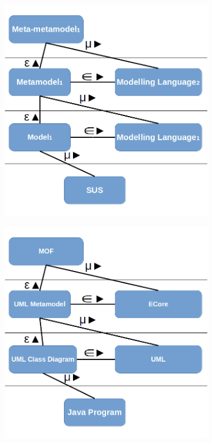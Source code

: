 \documentclass[tuberlin,cic,tc,english,noabntcite]{iiufrgs}
\begin{document}
\begin{description}
	\begin{figure}[H]
		\caption{The summary of the definitions of system, model, metamodel, meta-metamodel and modeling language.}
		\centering
		\begin{subfigure}[h]{.3\textwidth}
   			\includegraphics[width=\textwidth]{model_scheme}
		\end{subfigure}
		\begin{subfigure}[h]{.3\textwidth}
			\includegraphics[width=\textwidth]{model_scheme_practice}
		\end{subfigure}
		\label{fig:model_scheme}
	\end{figure}


\end{description}
\end{document}
